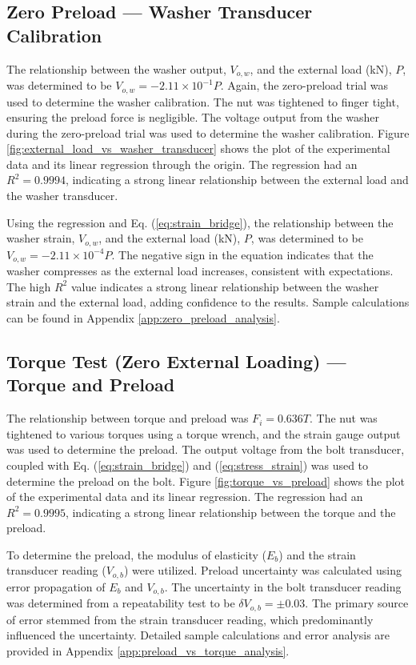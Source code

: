 \subsection{Zero Preload --- Washer Transducer Calibration}
The relationship between the washer output, $V_{o, w}$, and the external load (kN), $P$, was determined to be $V_{o, w} = -2.11 \times 10^{-1}P$. Again, the zero-preload trial was used to determine the washer calibration. The nut was tightened to finger tight, ensuring the preload force is negligible. The voltage output from the washer during the zero-preload trial was used to determine the washer calibration. Figure \ref{fig:external_load_vs_washer_transducer} shows the plot of the experimental data and its linear regression through the origin. The regression had an $R^2 = 0.9994$, indicating a strong linear relationship between the external load and the washer transducer.

Using the regression and Eq. (\ref{eq:strain_bridge}), the relationship between the washer strain, $V_{o, w}$, and the external load (kN), $P$, was determined to be $V_{o, w} = -2.11 \times 10^{-4}P$. The negative sign in the equation indicates that the washer compresses as the external load increases, consistent with expectations. The high $R^2$ value indicates a strong linear relationship between the washer strain and the external load, adding confidence to the results. Sample calculations can be found in Appendix \ref{app:zero_preload_analysis}.

\subsection{Torque Test (Zero External Loading) --- Torque and Preload}
\label{sec:zero_loading_torque_preload}
The relationship between torque and preload was $F_i = 0.636T$. The nut was tightened to various torques using a torque wrench, and the strain gauge output was used to determine the preload. The output voltage from the bolt transducer, coupled with Eq. (\ref{eq:strain_bridge}) and (\ref{eq:stress_strain}) was used to determine the preload on the bolt. Figure \ref{fig:torque_vs_preload} shows the plot of the experimental data and its linear regression. The regression had an $R^2 = 0.9995$, indicating a strong linear relationship between the torque and the preload. 

To determine the preload, the modulus of elasticity ($E_b$) and the strain transducer reading ($V_{o, b}$) were utilized. Preload uncertainty was calculated using error propagation of $E_b$ and $V_{o, b}$. The uncertainty in the bolt transducer reading was determined from a repeatability test to be $\delta V_{o, b} = \pm 0.03$. The primary source of error stemmed from the strain transducer reading, which predominantly influenced the uncertainty. Detailed sample calculations and error analysis are provided in Appendix \ref{app:preload_vs_torque_analysis}.

